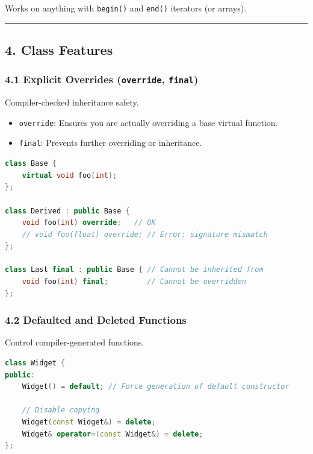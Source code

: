 Works on anything with \passthrough{\lstinline!begin()!} and
\passthrough{\lstinline!end()!} iterators (or arrays).

\begin{center}\rule{0.5\linewidth}{0.5pt}\end{center}

\hypertarget{class-features}{%
\subsection{4. Class Features}\label{class-features}}

\hypertarget{explicit-overrides-override-final}{%
\subsubsection{\texorpdfstring{4.1 Explicit Overrides
(\texttt{override},
\texttt{final})}{4.1 Explicit Overrides (override, final)}}\label{explicit-overrides-override-final}}

Compiler-checked inheritance safety.

\begin{itemize}
\tightlist
\item
  \passthrough{\lstinline!override!}: Ensures you are actually
  overriding a base virtual function.
\item
  \passthrough{\lstinline!final!}: Prevents further overriding or
  inheritance.
\end{itemize}

\begin{lstlisting}[language={C++}]
class Base {
    virtual void foo(int);
};

class Derived : public Base {
    void foo(int) override;   // OK
    // void foo(float) override; // Error: signature mismatch
};

class Last final : public Base { // Cannot be inherited from
    void foo(int) final;         // Cannot be overridden
};
\end{lstlisting}

\hypertarget{defaulted-and-deleted-functions}{%
\subsubsection{4.2 Defaulted and Deleted
Functions}\label{defaulted-and-deleted-functions}}

Control compiler-generated functions.

\begin{lstlisting}[language={C++}]
class Widget {
public:
    Widget() = default; // Force generation of default constructor

    // Disable copying
    Widget(const Widget&) = delete;
    Widget& operator=(const Widget&) = delete;
};
\end{lstlisting}

